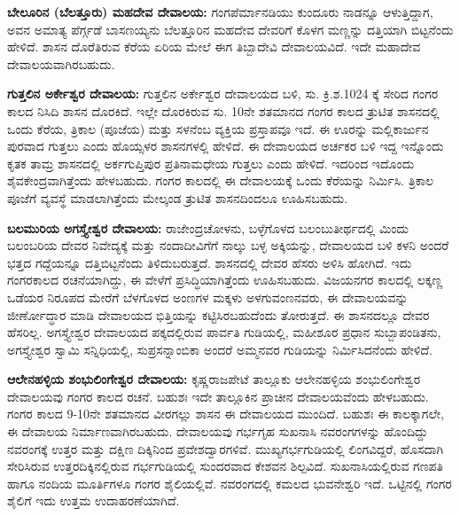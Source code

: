 \textbf{ಬೇಲೂರಿನ (ಬೆಲತ್ತೂರು) ಮಹದೇವ ದೇವಾಲಯ:} ಗಂಗಪೆರ್ಮಾನಡಿಯು ಕುಂದೂರು ನಾಡನ್ನೂ ಆಳುತ್ತಿದ್ದಾಗ, ಅವನ ಅಮಾತ್ಯ ಪೆರ್ಗ್ಗಡೆ ಬಾಸಣಯ್ಯನು ಬೆಲತ್ತೂರಿನ ಮಹದೇವ ದೇವರಿಗೆ ಕೊಳಗ ಮಣ್ಣನ್ನು ದತ್ತಿಯಾಗಿ ಬಿಟ್ಟನೆಂದು ಹೇಳಿದೆ. ಶಾಸನ ದೊರೆತಿರುವ ಕೆರೆಯ ಏರಿಯ ಮೇಲೆ ಈಗ ತಿಬ್ಬಾದೇವಿ ದೇವಾಲಯವಿದೆ. ಇದೇ ಮಹಾದೇವ ದೇವಾಲಯವಾಗಿರಬಹುದು.

\textbf{ಗುತ್ತಲಿನ ಅರ್ಕೇಶ್ವರ ದೇವಾಲಯ:} ಗುತ್ತಲಿನ ಅರ್ಕೇಶ್ವರ ದೇವಾಲಯದ ಬಳಿ, ಸು. ಕ್ರಿ.ಶ.1024 ಕ್ಕೆ ಸೇರಿದ ಗಂಗರ ಕಾಲದ ನಿಸಿದಿ ಶಾಸನ ದೊರಕಿದೆ. ಇಲ್ಲೇ ದೊರಕಿರುವ ಸು. 10ನೇ ಶತಮಾನದ ಗಂಗರ ಕಾಲದ ತ್ರುಟಿತ ಶಾಸನದಲ್ಲಿ ಒಂದು ಕೆರೆಯ, ತ್ರಿಕಾಲ (ಪೂಜೆಯ) ಮತ್ತು ಸಳನೆಂಬ ವ್ಯಕ್ತಿಯ ಪ್ರಸ್ತಾಪವೂ ಇದೆ. ಈ ಊರನ್ನು ಮಲ್ಲಿಕಾರ್ಜುನ ಪುರವಾದ ಗುತ್ತಲು ಎಂದು ಹೊಯ್ಸಳರ ಶಾಸನಗಳಲ್ಲಿ ಹೇಳಿದೆ. ಈ ದೇವಾಲಯದ ಅರ್ಚಕರ ಬಳಿ ಇದ್ದ ಇನ್ನೊಂದು ಕೃತಕ ತಾಮ್ರ ಶಾಸನದಲ್ಲಿ ಅರ್ಕಗುಪ್ತಿಪುರ ಪ್ರತಿನಾಮಧೇಯ ಗುತ್ತಲು ಎಂದು ಹೇಳಿದೆ. ಇದರಿಂದ ಇದೊಂದು ಶೈವಕೇಂದ್ರವಾಗಿತ್ತೆಂದು ಹೇಳಬಹುದು. ಗಂಗರ ಕಾಲದಲ್ಲಿ ಈ ದೇವಾಲಯಕ್ಕೆ ಒಂದು ಕೆರೆಯನ್ನು ನಿರ್ಮಿಸಿ. ತ್ರಿಕಾಲ ಪೂಜೆಗೆ ವ್ಯವಸ್ಥೆ ಮಾಡಲಾಗಿತ್ತೆಂದು ಮೇಲ್ಕಂಡ ತ್ರುಟಿತ ಶಾಸನದಿಂದಲೂ ಊಹಿಸಬಹುದು.

\vskip -1pt

\textbf{ಬಲಮುರಿಯ ಅಗಸ್ತ್ಯೇಶ್ವರ ದೇವಾಲಯ:} ರಾಜೇಂದ್ರಚೋಳನು, ಬಳ್ಳೆಗೊಳದ ಬಲಂಬುತೀರ್ಥದಲ್ಲಿ ಮಿಂದು ಬಲಂಬರಿಯ ದೇವರ ನಿವೇದ್ಯಕ್ಕೆ ಮತ್ತು ನಂದಾದೀವಿಗೆಗೆ ನಾಲ್ಕು ಬಳ್ಳ ಅಕ್ಕಿಯನ್ನು, ದೇವಾಲಯದ ಬಳಿ ಕಳನಿ ಅಂದರೆ ಭತ್ತದ ಗದ್ದೆಯನ್ನೂ ದತ್ತಿಬಿಟ್ಟನೆಂದು ತಿಳಿದುಬರುತ್ತದೆ. ಶಾಸನದಲ್ಲಿ ದೇವರ ಹೆಸರು ಅಳಿಸಿ ಹೋಗಿದೆ. ಇದು ಗಂಗರಕಾಲದ ರಚನೆಯಾಗಿದ್ದು, ಈ ವೇಳೆಗೆ ಪ್ರಸಿದ್ಧಿಯಾಗಿತ್ತೆಂದು ಊಹಿಸಬಹುದು. ವಿಜಯನಗರ ಕಾಲದಲ್ಲಿ ಲಕ್ಕಣ್ಣ ಒಡೆಯರ ನಿರೂಪದ ಮೇರೆಗೆ ಬೆಳಗೊಳದ ಅಂಣಗಳ ಮಕ್ಕಳು ಅಳಗುವಂಣನವರು, ಈ ದೇವಾಲಯವನ್ನು ಜೀರ್ಣೋದ್ಧಾರ ಮಾಡಿ ದೇವಾಲಯದ ಭಿತ್ತಿಯನ್ನು ಕಟ್ಟಿಸಿರಬಹುದೆಂದು ತೋರುತ್ತದೆ. ಈ ಶಾಸನದಲ್ಲೂ ದೇವರ ಹೆಸರಿಲ್ಲ. ಅಗಸ್ತ್ಯೇಶ್ವರ ದೇವಾಲಯದ ಪಕ್ಕದಲ್ಲಿರುವ ಪಾರ್ವತಿ ಗುಡಿಯಲ್ಲಿ, ಮಹೀಶೂರ ಪ್ರಧಾನ ಸುಬ್ಬಾಪಂಡಿತನು, ಅಗಸ್ತ್ಯೇಶ್ವರ ಸ್ವಾಮಿ ಸನ್ನಿಧಿಯಲ್ಲಿ, ಸುಪ್ರಸನ್ನಾಂಬಿಕಾ ಅಂದರೆ ಅಮ್ಮನವರ ಗುಡಿಯನ್ನು ನಿರ್ಮಿಸಿದನೆಂದು ಹೇಳಿದೆ.

\vskip -1pt

\textbf{ಆಲೇನಹಳ್ಳಿಯ ಶಂಭುಲಿಂಗೇಶ್ವರ ದೇವಾಲಯ:} ಕೃಷ್ಣರಾಜಪೇಟೆ ತಾಲ್ಲೂಕು ಆಲೇನಹಳ್ಳಿಯ ಶಂಭುಲಿಂಗೇಶ್ವರ ದೇವಾಲಯವು ಗಂಗರ ಕಾಲದ ರಚನೆ. ಬಹುಶಃ ಇದೇ ತಾಲ್ಲೂಕಿನ ಪ್ರಾಚೀನ ದೇವಾಲಯವೆಂದು ಹೇಳಬಹುದು. ಗಂಗರ ಕಾಲದ 9-10ನೇ ಶತಮಾನದ ವೀರಗಲ್ಲು ಶಾಸನ ಈ ದೇವಾಲಯದ ಮುಂದಿದೆ. ಬಹುಶಃ ಈ ಕಾಲಕ್ಕಾಗಲೇ, ಈ ದೇವಾಲಯ ನಿರ್ಮಾಣವಾಗಿರಬಹುದು. ದೇವಾಲಯವು ಗರ್ಭಗೃಹ ಸುಖನಾಸಿ ನವರಂಗಗಳನ್ನು ಹೊಂದಿದ್ದು ನವರಂಗಕ್ಕೆ ಉತ್ತರ ಮತ್ತು ದಕ್ಷಿಣ ದಿಕ್ಕಿನಿಂದ ಪ್ರವೇಶದ್ವಾರಗಳಿವೆ. ಮುಖ್ಯಗರ್ಭಗುಡಿಯಲ್ಲಿ ಲಿಂಗವಿದ್ದರೆ, ಹೊಸದಾಗಿ ಸೇರಿಸಿರುವ ಉತ್ತರದಿಕ್ಕಿನಲ್ಲಿರುವ ಗರ್ಭಗುಡಿಯಲ್ಲಿ ಸುಂದರವಾದ ಕೇಶವನ ಶಿಲ್ಪವಿದೆ. ಸುಖನಾಸಿಯಲ್ಲಿರುವ ಗಣಪತಿ ಹಾಗೂ ನಂದಿಯ ಮೂರ್ತಿಗಳೂ ಗಂಗರ ಶೈಲಿಯಲ್ಲಿವೆ. ನವರಂಗದಲ್ಲಿ ಕಮಲದ ಭುವನೇಶ್ವರಿ ಇದೆ. ಒಟ್ಟಿನಲ್ಲಿ ಗಂಗರ ಶೈಲಿಗೆ ಇದು ಉತ್ತಮ ಉದಾಹರಣೆಯಾಗಿದೆ.


